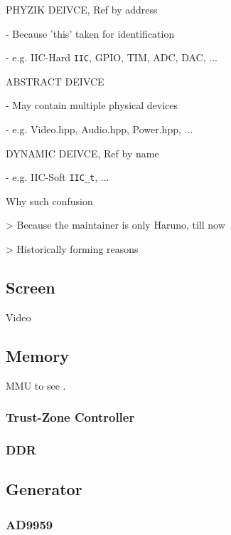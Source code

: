 PHYZIK DEIVCE, Ref by address

- Because 'this' taken for identification

- e.g. IIC-Hard \verb|IIC|, GPIO, TIM, ADC, DAC, ...

ABSTRACT DEIVCE

- May contain multiple physical devices

- e.g. Video.hpp, Audio.hpp, Power.hpp, ...

DYNAMIC DEIVCE, Ref by name

- e.g. IIC-Soft \verb|IIC_t|, ...

Why such confusion

\textgreater{} Because the maintainer is only Haruno, till now

\textgreater{} Historically forming reasons



\subsection{Screen}

{Video}



\subsection{Memory}

MMU to see .



\subsubsection{Trust-Zone Controller}



\subsubsection{DDR}



\subsection{Generator}



\subsubsection{AD9959}

